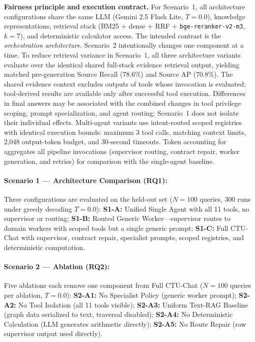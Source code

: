 \textbf{Fairness principle and execution contract.} For Scenario~1, all architecture configurations share the same LLM (Gemini 2.5 Flash Lite, $T{=}0.0$), knowledge representations, retrieval stack (BM25 + dense + RRF + \texttt{bge-reranker-v2-m3}, $k{=}7$), and deterministic calculator access. The intended contrast is the \emph{orchestration architecture}. Scenario~2 intentionally changes one component at a time. To reduce retrieval variance in Scenario~1, all three architecture variants evaluate over the identical shared full-stack evidence retrieval output, yielding matched pre-generation Source Recall (78.6\%) and Source AP (70.8\%). The shared evidence context excludes outputs of tools whose invocation is evaluated; tool-derived results are available only after successful tool execution. Differences in final answers may be associated with the combined changes in tool privilege scoping, prompt specialization, and agent routing; Scenario~1 does not isolate their individual effects. Multi-agent variants use intent-routed scoped registries with identical execution bounds: maximum 3 tool calls, matching context limits, 2{,}048 output-token budget, and 30-second timeouts. Token accounting for \system{} aggregates all pipeline invocations (supervisor routing, contract repair, worker generation, and retries) for comparison with the single-agent baseline.

\paragraph{Scenario 1 --- Architecture Comparison (RQ1):}
Three configurations are evaluated on the held-out set ($N{=}100$ queries, 300 runs under greedy decoding $T{=}0.0$):
\textbf{S1-A:} Unified Single Agent with all 11 tools, no supervisor or routing;
\textbf{S1-B:} Routed Generic Worker---supervisor routes to domain workers with scoped tools but a single generic prompt;
\textbf{S1-C:} Full CTU-Chat with supervisor, contract repair, specialist prompts, scoped registries, and deterministic computation.

\paragraph{Scenario 2 --- Ablation (RQ2):}
Five ablations each remove one component from Full CTU-Chat ($N{=}100$ queries per ablation, $T{=}0.0$):
\textbf{S2-A1:} No Specialist Policy (generic worker prompt);
\textbf{S2-A2:} No Tool Isolation (all 11 tools visible);
\textbf{S2-A3:} Uniform Text-RAG Baseline (graph data serialized to text, traversal disabled);
\textbf{S2-A4:} No Deterministic Calculation (LLM generates arithmetic directly);
\textbf{S2-A5:} No Route Repair (raw supervisor output used directly).

